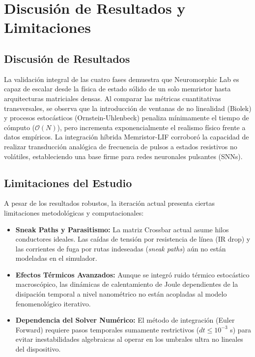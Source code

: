 \chapter{Discusión de Resultados y Limitaciones}
\label{ch:discusion_limitaciones}

\section{Discusión de Resultados}
La validación integral de las cuatro fases demuestra que Neuromorphic Lab es capaz de escalar desde la física de estado sólido de un solo memristor hasta arquitecturas matriciales densas. Al comparar las métricas cuantitativas transversales, se observa que la introducción de ventanas de no linealidad (Biolek) y procesos estocásticos (Ornstein-Uhlenbeck) penaliza mínimamente el tiempo de cómputo ($\mathcal{O}(N)$), pero incrementa exponencialmente el realismo físico frente a datos empíricos. La integración híbrida Memristor-LIF corroboró la capacidad de realizar transducción analógica de frecuencia de pulsos a estados resistivos no volátiles, estableciendo una base firme para redes neuronales pulsantes (SNNs).

\section{Limitaciones del Estudio}
A pesar de los resultados robustos, la iteración actual presenta ciertas limitaciones metodológicas y computacionales:
\begin{itemize}
    \item \textbf{Sneak Paths y Parasitismo:} La matriz Crossbar actual asume hilos conductores ideales. Las caídas de tensión por resistencia de línea (IR drop) y las corrientes de fuga por rutas indeseadas (\textit{sneak paths}) aún no están modeladas en el simulador.
    \item \textbf{Efectos Térmicos Avanzados:} Aunque se integró ruido térmico estocástico macroscópico, las dinámicas de calentamiento de Joule dependientes de la disipación temporal a nivel nanométrico no están acopladas al modelo fenomenológico iterativo.
    \item \textbf{Dependencia del Solver Numérico:} El método de integración (Euler Forward) requiere pasos temporales sumamente restrictivos ($dt \leq 10^{-3}$ s) para evitar inestabilidades algebraicas al operar en los umbrales ultra no lineales del dispositivo.
\end{itemize}

